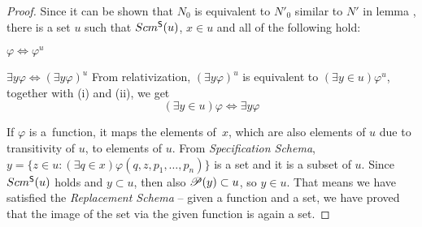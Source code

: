 \begin{proof}
Since it can be shown that $N_0$ is equivalent to $N'_0$ similar to $N'$ in lemma , 
there is a set $u$ such that $Scm^{\sf{S}}(u)$, $x \in u$ and all of the following hold:
\bce[(i)]
\item $\varphi \iff \varphi^{u}$
\item $\exists y \varphi \iff (\exists y \varphi)^{u}$
\ece
From relativization, $(\exists y \varphi)^{u}$ is equivalent to $(\exists y \in u) \varphi^{u}$, together with (i) and (ii), we get
\begin{equation}
(\exists y \in u)\varphi \iff \exists y \varphi
\end{equation}

If $\varphi$ is a~function, %
it maps the elements of~$x$, which are also elements of $u$ due to transitivity of $u$, to elements of $u$. 
From \emph{Specification Schema}, $y = \{ z \in u : (\exists q \in x)\varphi(q, z, p_1, \ldots, p_n)\}$ is a set and it is a subset of $u$. 
Since $Scm^{\sf{S}}(u)$ holds and $y \subset u$, then also $\mathscr{P} (y) \subset u$, so $y \in u$.
That means we have satisfied the \emph{Replacement Schema} – given a function and a set, we have proved that the image of the set via the given function is again a set.
\end{proof} %


